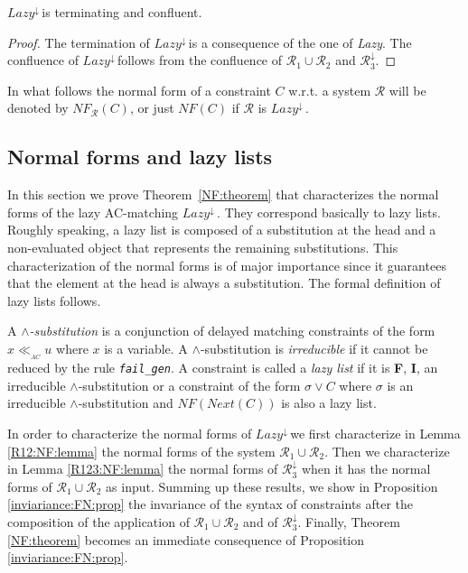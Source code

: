 \documentclass[submission,copyright,creativecommons]{eptcs}
\newcommand \matchth[3]{#1 {\ll}_{{ }_{#3}} {#2}}
\newcommand \matchAC[2]{\matchth{#1}{#2}{AC}}
\newcommand \lazy{$\textit{Lazy}^{\downarrow}\,$}
\newcommand \Ronetwo{\ensuremath{\mathcal{R}_1\cup\mathcal{R}_2}}
\newcommand \Rthree{\ensuremath{\mathcal{R}_3^{\downarrow}}}
\numberwithin{subcase}{case}
\begin{document}
\begin{theorem}
\label{lazy:term:conf:th}
 \lazy is terminating  and confluent.
\end{theorem}
\begin{proof}
The termination of \lazy is a consequence of the one of \textit{Lazy}. The 
confluence of \lazy follows from the  confluence of $\mathcal{R}_1\cup
\mathcal{R}_2$ and $\mathcal{R}_3^{\downarrow}$.
\end{proof}

In what follows the normal form of a constraint $C$ w.r.t. 
a system $\mathcal{R}$  will be denoted by $\textit{NF}_{\mathcal{R}}(C)$, or just
$\textit{NF}(C)$ if $\mathcal{R}$ is \lazy.

\subsection{Normal forms and lazy lists}
\label{NF:subsec}
In this section we prove Theorem~\ref{NF:theorem} that characterizes  the normal forms
of the lazy AC-matching \lazy. They correspond basically to lazy lists. 
Roughly speaking, a lazy list is composed of a  substitution at the head
 and  a non-evaluated  object that represents the remaining substitutions.  
This characterization of the normal forms is of major importance since 
it guarantees   that  the  element at the head  is always a substitution. 
The formal definition of lazy lists follows.

\begin{definition}
\label{wfll:def}
A \emph{$\land$-substitution} is a conjunction of delayed matching constraints of
the form $\matchAC{x}{u}$ where $x$ is a variable. A $\land$-substitution is
\emph{irreducible} if it cannot be reduced by the rule \texttt{\emph{fail\_gen}}. A
constraint is called a \emph{lazy list} if it is \textbf{F}, \textbf{I}, an
irreducible $\land$-substitution or a constraint of the form $\sigma \lor C$
where $\sigma$ is an irreducible $\land$-substitution and  
$\textit{NF}(\textit{Next}(C))$ is also a lazy list.
\end{definition}

In order to characterize the normal forms of \lazy we first characterize in Lemma
\ref{R12:NF:lemma} the normal forms  of the system $\mathcal{R}_1\cup
\mathcal{R}_2$. Then we characterize in Lemma
 \ref{R123:NF:lemma} the normal forms of $\Rthree$
when it has  the normal forms of $\Ronetwo$ as input. Summing up these results,
we show in
 Proposition \ref{inviariance:FN:prop}
the invariance of the syntax of constraints after the composition of the
application of $\Ronetwo$ and of $\Rthree$. Finally, Theorem \ref{NF:theorem}
becomes an immediate consequence of Proposition \ref{inviariance:FN:prop}.
\end{document}
